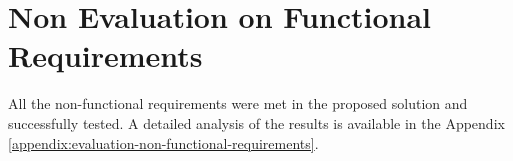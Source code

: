 \section{Non Evaluation on Functional Requirements}

All the non-functional requirements were met in the proposed solution and successfully tested. A detailed analysis of the results is available in the Appendix \ref{appendix:evaluation-non-functional-requirements}.